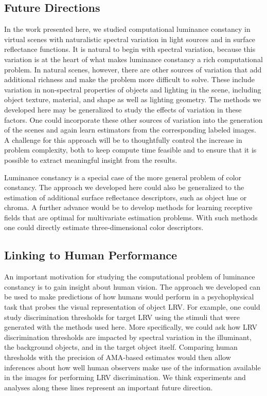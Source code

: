 \documentclass{jov}
\begin{document}
\subsection{Future Directions}
In the work presented here, we studied computational luminance constancy in virtual scenes with naturalistic spectral variation in light sources and in surface reflectance functions. 
It is natural to begin with spectral variation, because this variation is at the heart of what makes luminance constancy a rich computational problem.
In natural scenes, however, there are other sources of variation that add additional richness and make the problem more difficult to solve.
These include variation in non-spectral properties of objects and lighting in the scene, including object texture, material, and shape as well as lighting geometry. 
The methods we developed here may be generalized to study the effects of variation in these factors.
One could incorporate these other sources of variation into the generation of the scenes and again learn estimators from the corresponding labeled images. 
A challenge for this approach will be to thoughtfully control the increase in problem complexity, both to keep compute time feasible and to ensure that it is possible to extract meaningful insight from the results.

Luminance constancy is a special case of the more general problem of color constancy.
The approach we developed here could also be generalized to the estimation of additional surface reflectance descriptors, such as object hue or chroma.
A further advance would be to develop methods for learning receptive fields that are optimal for multivariate estimation problems. 
With such methods one could directly estimate three-dimensional color descriptors.

\subsection{Linking to Human Performance}

An important motivation for studying the computational problem of luminance constancy is to gain insight about human vision.
The approach we developed can be used to make predictions of how humans would perform in a psychophysical task that probes the visual representation of object LRV.
For example, one could study discrimination thresholds for target LRV using the stimuli that were generated with the methods used here.
More specifically, we could ask how LRV discrimination thresholds are impacted by spectral variation in the illuminant, the background objects, and in the target object itself.
Comparing human thresholds with the precision of AMA-based estimates would then allow inferences about how well human observers make use of the information available in the images for performing LRV discrimination.
We think experiments and analyses along these lines represent an important future direction.



\end{document}
